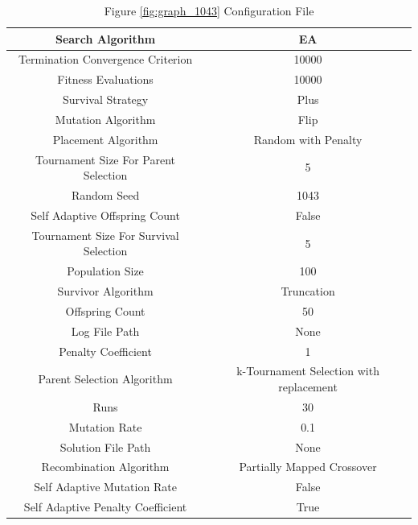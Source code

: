 \documentclass{standalone}
\begin{document}
\begin{table}[!htb]
	\centering
	\caption{Figure \ref{fig:graph_1043} Configuration File}
	\label{tab:graph_1043}
	\begin{tabular}{| c | c |}
		\hline
		Search Algorithm		& EA		 \\
		\hline
		Termination Convergence Criterion		& 10000		 \\
		\hline
		Fitness Evaluations		& 10000		 \\
		\hline
		Survival Strategy		& Plus		 \\
		\hline
		Mutation Algorithm		& Flip		 \\
		\hline
		Placement Algorithm		& Random with Penalty		 \\
		\hline
		Tournament Size For Parent Selection		& 5		 \\
		\hline
		Random Seed		& 1043		 \\
		\hline
		Self Adaptive Offspring Count		& False		 \\
		\hline
		Tournament Size For Survival Selection		& 5		 \\
		\hline
		Population Size		& 100		 \\
		\hline
		Survivor Algorithm		& Truncation		 \\
		\hline
		Offspring Count		& 50		 \\
		\hline
		Log File Path		& None		 \\
		\hline
		Penalty Coefficient		& 1		 \\
		\hline
		Parent Selection Algorithm		& k-Tournament Selection with replacement		 \\
		\hline
		Runs		& 30		 \\
		\hline
		Mutation Rate		& 0.1		 \\
		\hline
		Solution File Path		& None		 \\
		\hline
		Recombination Algorithm		& Partially Mapped Crossover		 \\
		\hline
		Self Adaptive Mutation Rate		& False		 \\
		\hline
		Self Adaptive Penalty Coefficient		& True		 \\
		\hline
	\end{tabular}
\end{table}
\end{document}
